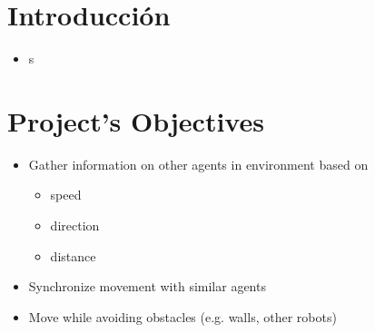 \documentclass[a0,portrait]{a0poster}
\begin{document}
\begin{multicols}{2} %




  \color{Black} %
  \section*{Introducción}
  \begin{itemize}
  \item s
  \end{itemize}



  \color{Black} %
  \section*{Project's Objectives}
  \begin{itemize}
  \item Gather information on other agents in environment based on
    \begin{itemize}
    \item speed
    \item direction
    \item distance
    \end{itemize}
  \item Synchronize movement with similar agents
  \item Move while avoiding obstacles (e.g. walls, other robots)
  \end{itemize}


\end{multicols}
\end{document}
